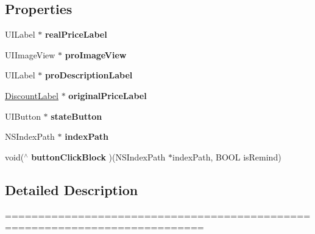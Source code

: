 \subsection*{Properties}
\begin{DoxyCompactItemize}
\item 
\mbox{\label{interface_f_n_h_sec_kill_public_cell_a22c8882881dc8aace943d09739948149}} 
U\+I\+Label $\ast$ {\bfseries real\+Price\+Label}
\item 
\mbox{\label{interface_f_n_h_sec_kill_public_cell_adf0d8bb6630a26888390e26d280896b6}} 
U\+I\+Image\+View $\ast$ {\bfseries pro\+Image\+View}
\item 
\mbox{\label{interface_f_n_h_sec_kill_public_cell_a99d98fde8128dcf9322a25ba5c4901b7}} 
U\+I\+Label $\ast$ {\bfseries pro\+Description\+Label}
\item 
\mbox{\label{interface_f_n_h_sec_kill_public_cell_a9addaa6e93d4d9b68e6e6653cd227ef9}} 
\mbox{\hyperlink{interface_discount_label}{Discount\+Label}} $\ast$ {\bfseries original\+Price\+Label}
\item 
\mbox{\label{interface_f_n_h_sec_kill_public_cell_a90b41b85b25234e51eea2d6d44116ac9}} 
U\+I\+Button $\ast$ {\bfseries state\+Button}
\item 
\mbox{\label{interface_f_n_h_sec_kill_public_cell_ab34cb231e46aa9d863f1e4c6900c6909}} 
N\+S\+Index\+Path $\ast$ {\bfseries index\+Path}
\item 
\mbox{\label{interface_f_n_h_sec_kill_public_cell_a353716364e0921c04f3795fe1458cae0}} 
void($^\wedge$ {\bfseries button\+Click\+Block} )(N\+S\+Index\+Path $\ast$index\+Path, B\+O\+OL is\+Remind)
\end{DoxyCompactItemize}


\subsection{Detailed Description}
============================================================================

